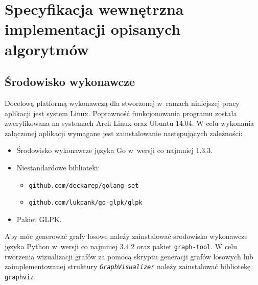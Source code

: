 \chapter{Specyfikacja wewnętrzna implementacji opisanych algorytmów}\label{s_internals}



\section{Środowisko wykonawcze}
\par{
  Docelową platformą wykonawczą dla stworzonej w~ramach niniejszej pracy aplikacji jest system Linux.
  Poprawność funkcjonowania programu została zweryfikowana na systemach Arch Linux oraz Ubuntu 14.04.
  W celu wykonania załączonej aplikacji wymagane jest zainstalowanie następujących zależności:
  \begin{itemize}
    \item Środowisko wykonawcze języka Go w~wersji co najmniej 1.3.3.
    \item Niestandardowe biblioteki:
    \begin{itemize}
      \item \texttt{github.com/deckarep/golang-set}
      \item \texttt{github.com/lukpank/go-glpk/glpk}
    \end{itemize}
    \item Pakiet GLPK.
  \end{itemize} 
  Aby móc generować grafy losowe należy zainstalować środowisko wykonawcze języka Python w~wersji co najmniej 3.4.2 oraz pakiet \texttt{graph-tool}.
  W celu tworzenia wizualizacji grafów za pomocą skryptu generacji grafów losowych lub zaimplementowanej struktury \textit{\lstinline{GraphVisualizer}} należy zainstalować bibliotekę \texttt{graphviz}.
}